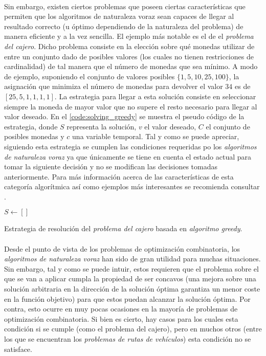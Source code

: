 \documentclass{subfiles}
\begin{document}
        \paragraph{}
        Sin embargo, existen ciertos problemas que poseen ciertas características que permiten que los algoritmos de naturaleza voraz sean capaces de llegar al resultado correcto (u óptimo dependiendo de la naturaleza del problema) de manera eficiente y a la vez sencilla. El ejemplo más notable es el de el \emph{problema del cajero}. Dicho problema consiste en la elección sobre qué monedas utilizar de entre un conjunto dado de posibles valores (los cuales no tienen restricciones de cardinalidad) de tal manera que el número de monedas que sea mínimo. A modo de ejemplo, suponiendo el conjunto de valores posibles $\{1,5,10, 25, 100\}$, la asignación que minimiza el número de monedas para devolver el valor $34$ es de $[25, 5, 1, 1, 1, 1]$. La estrategia para llegar a esta solución consiste en seleccionar siempre la moneda de mayor valor que no supere el resto necesario para llegar al valor deseado. En el \cref{code:solving_greedy} se muestra el pseudo código de la estrategia, donde $S$ representa la solución, $v$ el valor deseado, $C$ el conjunto de posibles monedas y $c$ una variable temporal. Tal y como se puede apreciar, siguiendo esta estrategia se cumplen las condiciones requeridas po los \emph{algoritmos de naturaleza voraz} ya que únicamente se tiene en cuenta el estado actual para tomar la siguiente decisión y no se modifican las decisiones tomadas anteriormente. Para más información acerca de las características de esta categoría algorítmica así como ejemplos más interesantes se recomienda consultar \cite{cormen2009introduction}.

        \begin{algorithm}[ht]
          \SetAlgoLined
          $S \gets [] $\;
          \caption{Estrategia de resolución del \emph{problema del cajero} basada en \emph{algoritmo greedy}.}
          \label{code:solving_greedy}
        \end{algorithm}

        \paragraph{}
        Desde el punto de vista de los problemas de optimización combinatoria, los \emph{algoritmos de naturaleza voraz} han sido de gran utilidad para muchas situaciones. Sin embargo, tal y como se puede intuir, estos requieren que el problema sobre el que se van a aplicar cumpla la propiedad de ser concavos (una mejora sobre una solución arbitraria en la dirección de la solución óptima garantiza un menor coste en la función objetivo) para que estos puedan alcanzar la solución óptima. Por contra, esto ocurre en muy pocas ocasiones en la mayoría de problemas de optimización combinatoria. Si bien es cierto, hay casos para los cuales esta condición si se cumple (como el problema del cajero), pero en muchos otros (entre los que se encuentran los \emph{problemas de rutas de vehículos}) esta condición no se satisface.
\end{document}
